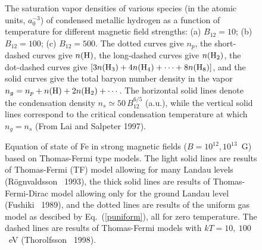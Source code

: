 \begin{figure}[t]
\vspace*{78mm}
\caption{
The saturation vapor densities of various species 
(in the atomic units, $a_0^{-3}$) of condensed metallic hydrogen 
as a function of temperature for different magnetic 
field strengths: (a) $B_{12}=10$; (b) $B_{12}=100$; (c) $B_{12}=500$.
The dotted curves give $n_p$, the short-dashed curves give $n({\rm H})$,
the long-dashed curves give $n({\rm H}_2)$, the dot-dashed curves
give $[3n({\rm H}_3)+4n({\rm H}_4)+\cdots+8n({\rm H}_{8})]$, and the
solid curves give the total baryon number density in the vapor
$n_g=n_p+n({\rm H})+2n({\rm H}_2)+\cdots$. 
The horizontal solid lines denote the condensation density $n_s\simeq
50\,B_{12}^{6/5}$ (a.u.), while the vertical solid lines correspond to 
the critical condensation temperature at which $n_g=n_s$ (From 
Lai and Salpeter 1997).
}
\end{figure}


\clearpage

\begin{figure}[t]
\vspace*{60mm}
\caption{Equation of state of Fe in strong magnetic fields 
($B=10^{12},10^{13}$~G) based on Thomas-Fermi type models.
The light solid lines are results of Thomas-Fermi (TF) model allowing for many
Landau levels (R\"ognvaldsson \etal~1993), the thick solid lines are results
of Thomas-Fermi-Dirac model allowing only for the ground Landau level (Fushiki
\etal~1989), and the dotted lines are results of the uniform gas model as
descibed by Eq.~(\ref{puniform}), 
all for zero temperature. The dashed lines are results
of Thomas-Fermi models with $kT=10,~100$~eV (Thorolfsson \etal~1998). 
}
\end{figure}

\clearpage


